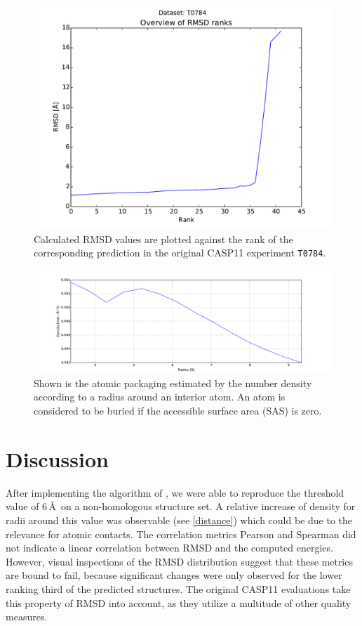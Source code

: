 \documentclass[11pt,a4paper]{article}
\begin{document}
\begin{figure}[tbp]%
    \centering
    \includegraphics[width=.7\textwidth]{../results/rank_T0784}
    \caption{Calculated RMSD values are plotted against the rank of the
        corresponding prediction in the original CASP11 experiment
        \texttt{T0784}.}
    \label{ranks}
\end{figure}
\begin{figure}[tbp]%
    \centering
    \includegraphics[width=1\textwidth]{figures/better.pdf}
    \caption{Shown is the atomic packaging estimated by the number density
    according to a radius around an interior atom. An atom is considered to be
    buried if the accessible surface area (SAS) is zero.}
    \label{distance}
\end{figure}



\section{Discussion}

After implementing the algorithm of \citet{Zhang1997}, we were able to reproduce
the threshold value of $6$\,\AA\ on a non-homologous structure set.
A relative increase of density
for radii around this value
was observable (see \autoref{distance}) which could be
due to the relevance for atomic contacts.
The correlation metrics Pearson and Spearman did not indicate a linear
correlation between RMSD and the computed energies.
However, visual inspections 
of the RMSD distribution suggest that these metrics are bound to fail, because
significant changes were only observed for the lower ranking third of the
predicted structures.
The original CASP11 evaluations take this property of RMSD into account, as they utilize a multitude of other quality measures.
\end{document}
